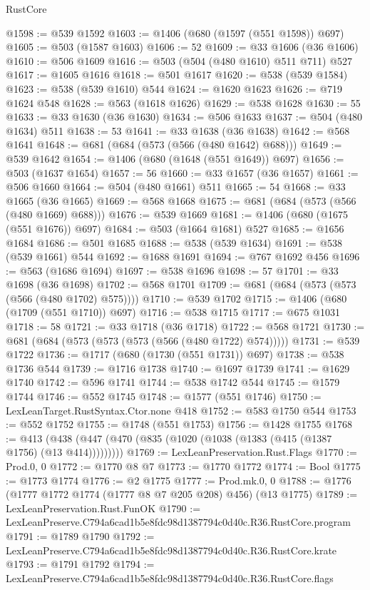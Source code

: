 \begin{lexlean}{RustCore}
\begin{coremodule}
@1598 := @539 @1592
@1603 := @1406 (@680 (@1597 (@551 @1598)) @697)
@1605 := @503 (@1587 @1603)
@1606 := 52
@1609 := @33 @1606 (@36 @1606)
@1610 := @506 @1609
@1616 := @503 (@504 (@480 @1610) @511 @711) @527
@1617 := @1605 @1616
@1618 := @501 @1617
@1620 := @538 (@539 @1584)
@1623 := @538 (@539 @1610) @544
@1624 := @1620 @1623
@1626 := @719 @1624 @548
@1628 := @563 (@1618 @1626)
@1629 := @538 @1628
@1630 := 55
@1633 := @33 @1630 (@36 @1630)
@1634 := @506 @1633
@1637 := @504 (@480 @1634) @511
@1638 := 53
@1641 := @33 @1638 (@36 @1638)
@1642 := @568 @1641
@1648 := @681 (@684 (@573 (@566 (@480 @1642) @688)))
@1649 := @539 @1642
@1654 := @1406 (@680 (@1648 (@551 @1649)) @697)
@1656 := @503 (@1637 @1654)
@1657 := 56
@1660 := @33 @1657 (@36 @1657)
@1661 := @506 @1660
@1664 := @504 (@480 @1661) @511
@1665 := 54
@1668 := @33 @1665 (@36 @1665)
@1669 := @568 @1668
@1675 := @681 (@684 (@573 (@566 (@480 @1669) @688)))
@1676 := @539 @1669
@1681 := @1406 (@680 (@1675 (@551 @1676)) @697)
@1684 := @503 (@1664 @1681) @527
@1685 := @1656 @1684
@1686 := @501 @1685
@1688 := @538 (@539 @1634)
@1691 := @538 (@539 @1661) @544
@1692 := @1688 @1691
@1694 := @767 @1692 @456
@1696 := @563 (@1686 @1694)
@1697 := @538 @1696
@1698 := 57
@1701 := @33 @1698 (@36 @1698)
@1702 := @568 @1701
@1709 := @681 (@684 (@573 (@573 (@566 (@480 @1702) @575))))
@1710 := @539 @1702
@1715 := @1406 (@680 (@1709 (@551 @1710)) @697)
@1716 := @538 @1715
@1717 := @675 @1031
@1718 := 58
@1721 := @33 @1718 (@36 @1718)
@1722 := @568 @1721
@1730 := @681 (@684 (@573 (@573 (@573 (@566 (@480 @1722) @574)))))
@1731 := @539 @1722
@1736 := @1717 (@680 (@1730 (@551 @1731)) @697)
@1738 := @538 @1736 @544
@1739 := @1716 @1738
@1740 := @1697 @1739
@1741 := @1629 @1740
@1742 := @596 @1741
@1744 := @538 @1742 @544
@1745 := @1579 @1744
@1746 := @552 @1745
@1748 := @1577 (@551 @1746)
@1750 := LexLeanTarget.RustSyntax.Ctor.none @418
@1752 := @583 @1750 @544
@1753 := @552 @1752
@1755 := @1748 (@551 @1753)
@1756 := @1428 @1755
@1768 := @413 (@438 (@447 (@470 (@835 (@1020 (@1038 (@1383 (@415 (@1387 @1756) (@13 @414)))))))))
@1769 := LexLeanPreservation.Rust.Flags
@1770 := Prod.{0, 0}
@1772 := @1770 @8 @7
@1773 := @1770 @1772
@1774 := Bool
@1775 := @1773 @1774
@1776 := @2 @1775
@1777 := Prod.mk.{0, 0}
@1788 := @1776 (@1777 @1772 @1774 (@1777 @8 @7 @205 @208) @456) (@13 @1775)
@1789 := LexLeanPreservation.Rust.FunOK
@1790 := LexLeanPreserve.C794a6cad1b5e8fdc98d1387794c0d40c.R36.RustCore.program
@1791 := @1789 @1790
@1792 := LexLeanPreserve.C794a6cad1b5e8fdc98d1387794c0d40c.R36.RustCore.krate
@1793 := @1791 @1792
@1794 := LexLeanPreserve.C794a6cad1b5e8fdc98d1387794c0d40c.R36.RustCore.flags

\end{coremodule}
\end{lexlean}
